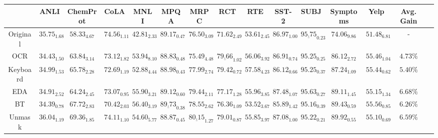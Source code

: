 

\begin{table*}[thbp]
    \centering
    \tiny
    \setlength{\tabcolsep}{1.2pt} %
    \renewcommand{\arraystretch}{1} %
\begin{tabular}{ccccccccccccccc}
    \toprule
    ~                      & ANLI               & ChemProt           & CoLA               & MNLI               & MPQA               & MRPC               & RCT                & RTE                & SST-2              & SUBJ               & Symptoms           & Yelp               & Avg. Gain \\
    \midrule
    Original       & \(35.75_{1.68}\)   & \(58.33_{4.67}\)   & \(74.56_{1.11}\)   & \(42.81_{2.33}\)   & \(89.17_{0.47}\)   & \(76.50_{3.09}\)   & \(71.62_{2.49}\)   & \(53.61_{2.45}\)   & \(86.97_{1.00}\)   & \(\underline{95.75}_{0.23}\) & \(74.06_{9.86}\)   & \(51.48_{6.81}\)   & -             \\
    OCR            & \(34.43_{1.50}\)   & \(63.84_{3.14}\)   & \(73.12_{1.82}\)   & \(53.94_{8.10}\)   & \(88.83_{0.48}\)   & \(75.49_{4.48}\)   & \(\underline{79.66}_{1.02}\)   & \(56.06_{3.92}\)   & \(86.91_{0.74}\)   & \(95.25_{0.25}\)   & \(86.12_{2.72}\)   & \(55.46_{1.04}\)   & \(4.73\%\)    \\
    Keyboard       & \(34.99_{1.53}\)   & \(65.78_{2.28}\)   & \(72.69_{1.19}\)   & \(52.88_{4.44}\)   & \(88.98_{0.43}\)   & \(77.99_{2.74}\)   & \(79.42_{0.72}\)   & \(57.58_{4.23}\)   & \(86.12_{0.66}\)   & \(95.25_{0.37}\)   & \(87.24_{1.09}\)   & \(55.44_{0.62}\)   & \(5.40\%\)    \\
    EDA            & \(34.91_{2.52}\)   & \(64.24_{2.45}\)   & \(73.07_{0.95}\)   & \(55.90_{3.21}\)   & \(89.12_{0.60}\)   & \(79.44_{2.11}\)   & \(77.17_{1.28}\)   & \(55.96_{3.85}\)   & \(87.48_{1.07}\)   & \(95.63_{0.27}\)   & \(89.11_{1.45}\)   & \(55.15_{1.34}\)   & \(6.68\%\)    \\
    BT             & \(34.39_{0.78}\)   & \(67.72_{2.83}\)   & \(70.42_{2.03}\)   & \({56.40}_{3.19}\) & \(\underline{89.73}_{0.38}\) & \(78.55_{2.62}\)   & \(76.36_{1.09}\)   & \(53.52_{3.67}\)   & \(85.89_{1.42}\)   & \(95.16_{0.39}\)   & \(89.43_{0.59}\)   & \({55.56}_{0.85}\) & \(6.26\%\)    \\
    Unmask         & \(36.04_{1.19}\)   & \(69.36_{1.85}\)   & \(74.11_{1.10}\)   & \(54.60_{5.77}\)   & \(88.87_{0.45}\)   & \(\underline{80.15}_{1.27}\)   & \(79.01_{0.87}\)   & \(55.85_{3.97}\)   & \(87.08_{1.00}\)   & \(95.22_{0.21}\)   & \(89.92_{0.55}\)   & \(55.10_{0.69}\)   & \(6.59\%\)    \\

\end{tabular}
\end{table*}
